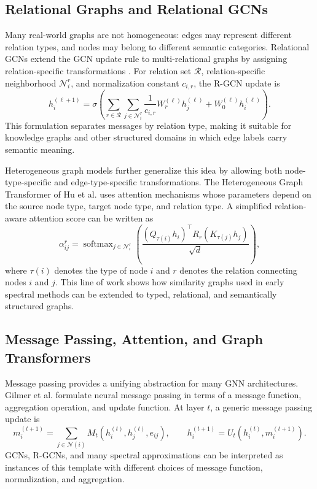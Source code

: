 \documentclass[11pt]{article}
\begin{document}
\subsection{Relational Graphs and Relational GCNs}
Many real-world graphs are not homogeneous: edges may represent different relation types, and nodes may belong to different semantic categories. Relational GCNs extend the GCN update rule to multi-relational graphs by assigning relation-specific transformations \cite{schlichtkrull2018modeling}. For relation set $\mathcal{R}$, relation-specific neighborhood $\mathcal{N}_i^r$, and normalization constant $c_{i,r}$, the R-GCN update is
\[
    h_i^{(\ell+1)}
    = \sigma\!\left(
        \sum_{r\in\mathcal{R}}\sum_{j\in\mathcal{N}_i^r}
        \frac{1}{c_{i,r}} W_r^{(\ell)}h_j^{(\ell)}
        + W_0^{(\ell)}h_i^{(\ell)}
      \right).
\]
This formulation separates messages by relation type, making it suitable for knowledge graphs and other structured domains in which edge labels carry semantic meaning.

Heterogeneous graph models further generalize this idea by allowing both node-type-specific and edge-type-specific transformations. The Heterogeneous Graph Transformer of Hu et al. \cite{hu2020heterogeneous} uses attention mechanisms whose parameters depend on the source node type, target node type, and relation type. A simplified relation-aware attention score can be written as
\[
    \alpha_{ij}^{r}
    = \operatorname{softmax}_{j\in\mathcal{N}_i^r}
      \left(
      \frac{(Q_{\tau(i)}h_i)^\top R_r(K_{\tau(j)}h_j)}{\sqrt{d}}
      \right),
\]
where $\tau(i)$ denotes the type of node $i$ and $r$ denotes the relation connecting nodes $i$ and $j$. This line of work shows how similarity graphs used in early spectral methods can be extended to typed, relational, and semantically structured graphs.

\subsection{Message Passing, Attention, and Graph Transformers}
Message passing provides a unifying abstraction for many GNN architectures. Gilmer et al. \cite{gilmer2017neural} formulate neural message passing in terms of a message function, aggregation operation, and update function. At layer $t$, a generic message passing update is
\[
    m_i^{(t+1)}
    = \sum_{j\in\mathcal{N}(i)} M_t\!\left(h_i^{(t)}, h_j^{(t)}, e_{ij}\right),
    \qquad
    h_i^{(t+1)}
    = U_t\!\left(h_i^{(t)}, m_i^{(t+1)}\right).
\]
GCNs, R-GCNs, and many spectral approximations can be interpreted as instances of this template with different choices of message function, normalization, and aggregation.
\end{document}

